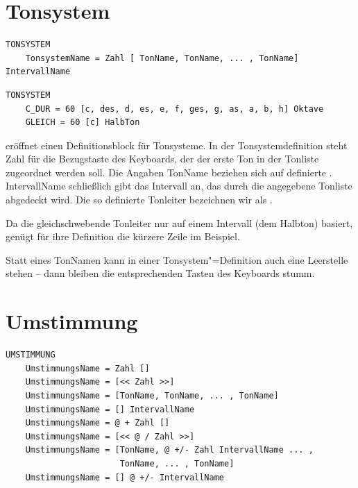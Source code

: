 {
\section{Tonsystem}
\label{sec:SX_TONESYSTEM}



\begin{verbatim}
TONSYSTEM
    TonsystemName = Zahl [ TonName, TonName, ... , TonName] IntervallName
\end{verbatim}




\begin{verbatim}
TONSYSTEM
    C_DUR = 60 [c, des, d, es, e, f, ges, g, as, a, b, h] Oktave 
    GLEICH = 60 [c] HalbTon
\end{verbatim}




 eröffnet einen Definitionsblock für Tonsysteme.  In der
Tonsystemdefinition steht Zahl für die Bezugstaste des Keyboards, der
der erste Ton in der Tonliste zugeordnet werden soll. Die Angaben
TonName beziehen sich auf definierte .
IntervallName schließlich gibt das Intervall an, das durch die
angegebene Tonliste abgedeckt wird. Die so definierte Tonleiter
bezeichnen wir als
.



Da die gleichschwebende Tonleiter nur auf einem Intervall (dem
Halbton) basiert, genügt für ihre Definition die kürzere Zeile im
Beispiel.


Statt eines TonNamen kann in einer Tonsystem"=Definition auch eine
Leerstelle stehen -- dann bleiben die entsprechenden Tasten des
Keyboards stumm.

\section{Umstimmung}
\label{sec:SX_RETUNING}


\begin{verbatim}
UMSTIMMUNG
    UmstimmungsName = Zahl [] 
    UmstimmungsName = [<< Zahl >>] 
    UmstimmungsName = [TonName, TonName, ... , TonName] 
    UmstimmungsName = [] IntervallName 
    UmstimmungsName = @ + Zahl [] 
    UmstimmungsName = [<< @ / Zahl >>] 
    UmstimmungsName = [TonName, @ +/- Zahl IntervallName ... ,
                       TonName, ... , TonName] 
    UmstimmungsName = [] @ +/- IntervallName
\end{verbatim}


}
